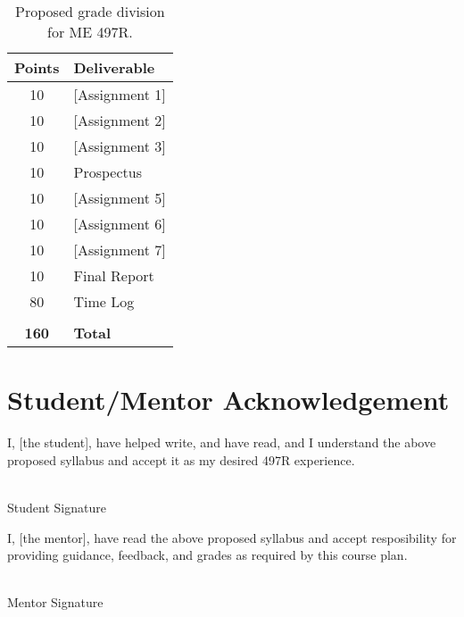 \documentclass[12pt]{article}
\begin{document}
\begin{table}[h!]
	\caption{Proposed grade division for ME 497R. }
	\label{tab:rubric}
	\renewcommand{\arraystretch}{1.2}
	\vspace*{1em}
	\begin{tabular}{c|l}
		\textbf{Points} & \textbf{Deliverable}\\ 
		\hline
		10 & [Assignment 1] \\
		10 & [Assignment 2] \\
		10 & [Assignment 3] \\
		10 & Prospectus     \\
		10 & [Assignment 5] \\
		10 & [Assignment 6] \\
		10 & [Assignment 7] \\
		10 & Final Report   \\
		80 & Time Log       \\
		   &                \\
		\textbf{160} & \textbf{Total} \\
		
	\end{tabular}
\end{table}

\newpage

\section*{Student/Mentor Acknowledgement}

I, [the student], have helped write, and have read, and I understand the above proposed syllabus and accept it as my desired 497R experience.

\vspace{2em}

\noindent \makebox[2.5in]{\hrulefill} \hspace {1.0in}\makebox[2.5in]{\hrulefill} \\
Student Signature  \\

\bigskip

I, [the mentor], have read the above proposed syllabus and accept resposibility for providing guidance, feedback, and grades as required by this course plan.

\vspace{2em}

\noindent \makebox[2.5in]{\hrulefill} \hspace {1.0in}\makebox[2.5in]{\hrulefill} \\
Mentor Signature  \\
\end{document}
